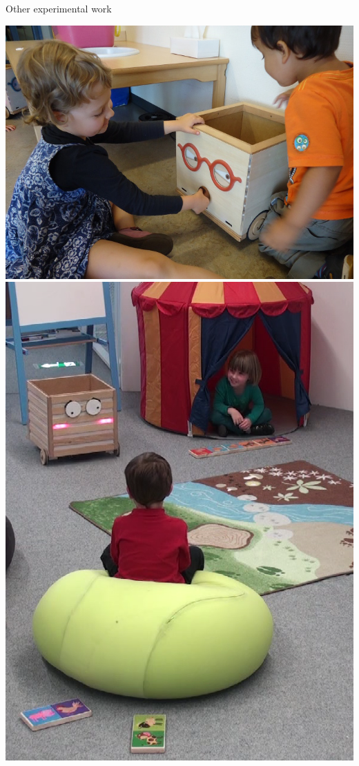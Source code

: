 \documentclass[xcolor=table]{beamer}
\begin{document}

\begin{frame}{Other experimental work}

            \hyperlink{croquignole}{\includegraphics[height=0.2\paperheight]{ranger/croquignole-single}}
            \hspace{0.5em}
            \hyperlink{dominos}{\includegraphics[height=0.2\paperheight]{ranger/domino-mistake}}

\end{frame}
\end{document}
